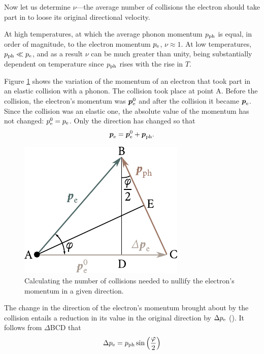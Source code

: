 Now let us determine $\nu$---the average number of collisions the electron should take part in to loose its original directional velocity.

At high temperatures, at which the average phonon momentum $p_{\text{ph}}$ is equal, in order of magnitude, to the electron momentum $p_{\text{e}}$, $\nu\approx 1$. At low temperatures, $p_{\text{ph}}\ll p_{\text{e}}$, and as a result $\nu$ can be much greater than unity, being substantially dependent on temperature since $p_{\text{ph}}$ rises with the rise in $T$.

Figure \ref{fig:6_8} shows the variation of the momentum of an electron that took part in an elastic collision with a phonon. The collision took place at point A. Before the collision, the electron's momentum was $\boldsymbol{p}_{\text{e}}^0$ and after the collision it became $\boldsymbol{p}_{\text{e}}$. Since the collision was an elastic one, the absolute value of the momentum has not changed: $p_{\text{e}}^0=p_{\text{e}}$. Only the direction has changed so that
\begin{equation*}
	\boldsymbol{p}_{\text{e}} = \boldsymbol{p}_{\text{e}}^0 + \boldsymbol{p}_{\text{ph}}.
\end{equation*}

\begin{figure}[t]
	\begin{center}
		\includegraphics[scale=1]{figures/ch_06/fig_6_8.pdf}
		\caption[]{Calculating the number of collisions needed to nullify the electron's momentum in a given direction.}
		\label{fig:6_8}
	\end{center}
	\vspace{-0.7cm}
\end{figure}

The change in the direction of the electron's momentum brought about by the collision entails a reduction in its value in the original direction by $\Delta{p_{\text{e}}}$ (). It follows from $\Delta$BCD that
\begin{equation*}
	\Delta{p_{\text{e}}} = p_{\text{ph}} \sin\left(\frac{\varphi}{2}\right)
\end{equation*}

